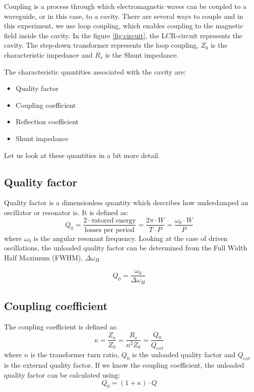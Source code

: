 \documentclass[a4paper]{article}
\numberwithin{equation}{section}
\begin{document}
Coupling is a process through which electromagnetic waves can be coupled to a waveguide, or in this case, to a cavity. There are several ways to couple and in this experiment, we use loop coupling, which enables coupling to the magnetic field inside the cavity. In the figure \ref{fig:circuit}, the LCR-circuit represents the cavity. The step-down transformer represents the loop coupling, $Z_{0}$ is the characteristic impedance and $R_{s}$ is the Shunt impedance. 

The characteristic quantities associated with the cavity are:
\begin{itemize}
		\item Quality factor 
		\item Coupling coefficient 
		\item Reflection coefficient 
		\item Shunt impedance
\end{itemize}

Let us look at these quantities in a bit more detail. 

\subsection{Quality factor}
Quality factor is a dimensionless quantity which describes how underdamped an oscillator or resonator is. It is defined as: 
\begin{equation}
		Q_{0} = \frac{2 \cdot \pi \text{stored energy} }{\text{losses per period}} = \frac{2 \pi \cdot W }{T\cdot P} =  \frac{\omega_{0}\cdot W}{P}
\end{equation}
where $\omega_{0}$ is the angular resonant frequency. 
Looking at the case of driven oscillations, the unloaded quality factor can be determined from the Full Width Half Maximum (FWHM), $\Delta \omega_{H}$

\begin{equation}
		Q_{0} = \frac{\omega_{0}}{\Delta \omega_{H}}
\end{equation}

\subsection{Coupling coefficient}
The coupling coefficient is defined as:
\begin{equation}
		\kappa = \frac{Z_{a}}{Z_{0}} = \frac{R_{s}}{n^2Z_{0}} = \frac{Q_{0}}{Q_{ext}}	
\end{equation}
where $n$ is the transformer turn ratio, $Q_{0}$ is the unloaded quality factor and $Q_{ext}$ is the external quality factor.  
If we know the coupling coefficient, the unloaded quality factor can be calculated using: 
\begin{equation}
		Q_{0} = \left(1 + \kappa\right)\cdot Q
\end{equation}
\end{document}
